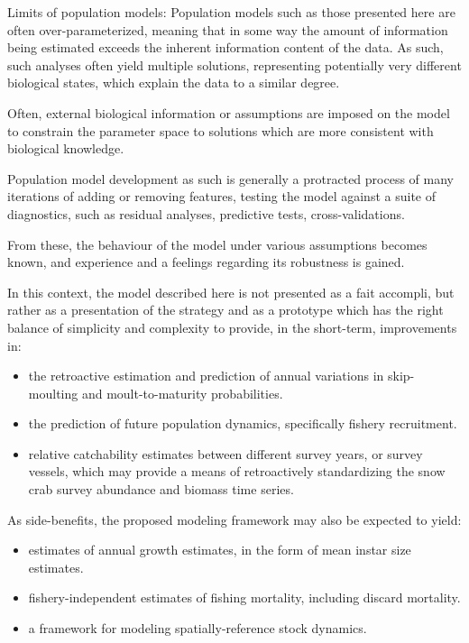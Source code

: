 \documentclass[
]{article}
\providecommand{\tightlist}{%
  \setlength{\itemsep}{0pt}\setlength{\parskip}{0pt}}
\begin{document}
Limits of population models: Population models such as those presented
here are often over-parameterized, meaning that in some way the amount
of information being estimated exceeds the inherent information content
of the data. As such, such analyses often yield multiple solutions,
representing potentially very different biological states, which explain
the data to a similar degree.

Often, external biological information or assumptions are imposed on the
model to constrain the parameter space to solutions which are more
consistent with biological knowledge.

Population model development as such is generally a protracted process
of many iterations of adding or removing features, testing the model
against a suite of diagnostics, such as residual analyses, predictive
tests, cross-validations.

From these, the behaviour of the model under various assumptions becomes
known, and experience and a feelings regarding its robustness is gained.

In this context, the model described here is not presented as a fait
accompli, but rather as a presentation of the strategy and as a
prototype which has the right balance of simplicity and complexity to
provide, in the short-term, improvements in:

\begin{itemize}
\tightlist
\item
  the retroactive estimation and prediction of annual variations in
  skip-moulting and moult-to-maturity probabilities.
\item
  the prediction of future population dynamics, specifically fishery
  recruitment.
\item
  relative catchability estimates between different survey years, or
  survey vessels, which may provide a means of retroactively
  standardizing the snow crab survey abundance and biomass time series.
\end{itemize}

As side-benefits, the proposed modeling framework may also be expected
to yield:

\begin{itemize}
\tightlist
\item
  estimates of annual growth estimates, in the form of mean instar size
  estimates.
\item
  fishery-independent estimates of fishing mortality, including discard
  mortality.
\item
  a framework for modeling spatially-reference stock dynamics.
\end{itemize}
\end{document}
